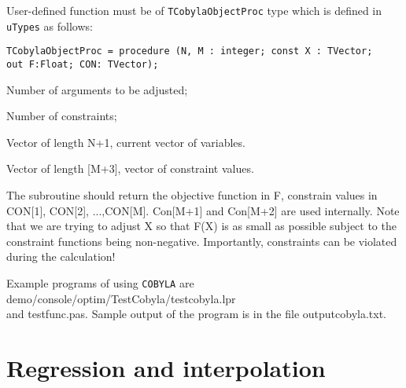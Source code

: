 \documentclass[12pt,a4paper,oneside]{article}
\newcommand{\code}[1]{\texttt{#1}}
\begin{document}
User-defined function must be of \code{TCobylaObjectProc} type which is defined in \code{uTypes} as follows:
\begin{verbatim}
TCobylaObjectProc = procedure (N, M : integer; const X : TVector;
out F:Float; CON: TVector);
\end{verbatim}
\begin{description}[noitemsep]
	\item[N] Number of arguments to be adjusted;
	\item[M] Number of constraints;
	\item[X] Vector of length N+1, current vector of variables.
	\item[Con] Vector of length [M+3], vector of constraint values.
\end{description}
The subroutine should return the objective function in F, constrain values in CON[1], CON[2],
...,CON[M]. Con[M+1] and Con[M+2] are used internally. Note that we are trying to
adjust X so that F(X) is as small as possible subject to the constraint functions
being non-negative. Importantly, constraints can be violated during the calculation!

Example programs of using \code{COBYLA} are\\
demo/console/optim/TestCobyla/testcobyla.lpr\\
and testfunc.pas. Sample output of the program is in the file outputcobyla.txt.
\section{Regression and interpolation}
\end{document}

